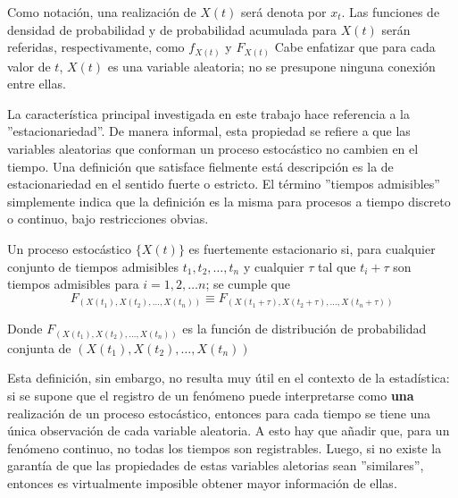 Como notaci\'on, una realizaci\'on de $X(t)$ ser\'a denota por $x_t$. 
Las funciones de densidad de probabilidad y de probabilidad acumulada para $X(t)$ ser\'an
referidas, respectivamente, como $f_{X(t)}$ y $F_{X(t)}$
Cabe enfatizar que para cada valor de $t$,
$X(t)$ es una variable aleatoria; no se presupone ninguna conexi\'on entre ellas.


La caracter\'istica principal 
investigada en este trabajo hace referencia a la ''estacionariedad''. De manera 
informal, esta propiedad se refiere a que las variables aleatorias que conforman un proceso
estoc\'astico no cambien en el tiempo. 
Una definici\'on que satisface fielmente est\'a descripci\'on es la de estacionariedad 
en el sentido fuerte o estricto.
El t\'ermino ''tiempos admisibles'' simplemente indica que la definici\'on es la misma para
procesos a tiempo discreto o continuo, bajo restricciones obvias.

\begin{defn}
Un proceso estoc\'astico $\{ X(t) \}$ es fuertemente estacionario si, para cualquier 
conjunto de tiempos admisibles $t_1,t_2,\dots,t_n$ y cualquier $\tau$ tal que 
 $t_i+\tau$ son tiempos admisibles para $i = 1, 2, \dots n$;
se cumple que
\begin{equation*}
F_{\left(X(t_1),X(t_2),\dots,X(t_n)\right) }
\equiv
F_{\left(X(t_1+\tau),X(t_2+\tau),\dots,X(t_n+\tau)\right)}
\end{equation*}

Donde $F_{\left(X(t_1),X(t_2),\dots,X(t_n)\right) }$ es la funci\'on de distribuci\'on de
probabilidad conjunta de $\left(X(t_1),X(t_2),\dots,X(t_n)\right)$
\end{defn}

Esta definici\'on, sin embargo, no resulta muy \'util en el contexto de la estad\'istica:
si se supone que el registro de un fen\'omeno puede interpretarse como \textbf{una} 
realizaci\'on de
un proceso estoc\'astico, entonces para cada tiempo se tiene una \'unica observaci\'on
de cada variable aleatoria. A esto hay que a\~nadir que, para un fen\'omeno continuo,
no todas los tiempos son registrables.
Luego, si no existe la garant\'ia de que las propiedades de estas variables aletorias sean
''similares'', entonces es virtualmente imposible obtener mayor informaci\'on de ellas.

